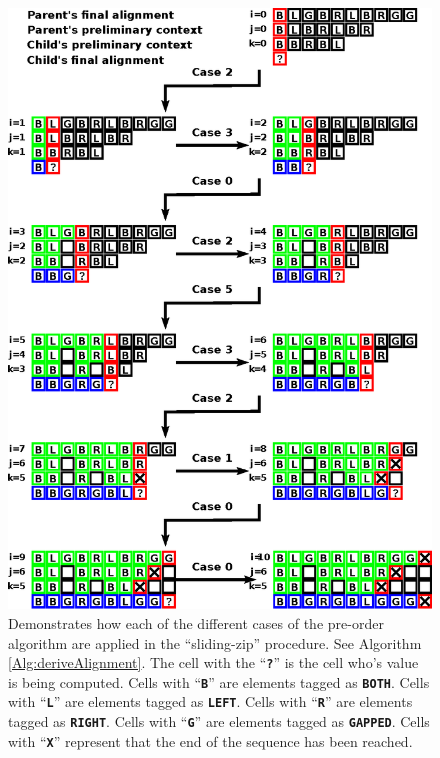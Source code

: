 \documentclass{bmcart}
\begin{document}
\begin{backmatter}
	\begin{figure}[h!]
		\caption{
			\newline Demonstrates how each of the different cases of the pre-order algorithm are applied in the ``sliding-zip'' procedure. See Algorithm \ref{Alg:deriveAlignment}.
			\newline
			The cell with the ``\textbf{\texttt{?}}'' is the cell who's value is being computed.
			\newline
			Cells with ``\textbf{\texttt{B}}'' are elements tagged as \textbf{\texttt{BOTH}}.
			\newline 
			Cells with ``\textbf{\texttt{L}}'' are elements tagged as \textbf{\texttt{LEFT}}.
			\newline 
			Cells with ``\textbf{\texttt{R}}'' are elements tagged as \textbf{\texttt{RIGHT}}.
			\newline
			Cells with ``\textbf{\texttt{G}}'' are elements tagged as \textbf{\texttt{GAPPED}}.
			\newline
			Cells with ``\textbf{\texttt{X}}'' represent that the end of the sequence has been reached.
		}
		\label{Fig:Examplepre-order}
		\vspace{2ex}
		\includegraphics{example-preorder.eps}
	\end{figure}
	

\end{backmatter}
\end{document}
